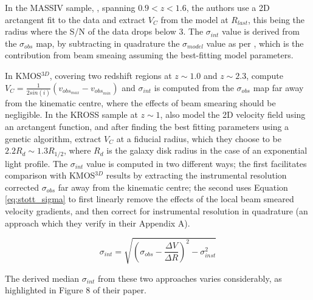 \documentclass[fleqn,usenatbib]{mn2e}
\begin{document}
In the MASSIV sample, \citep{Epinat2012}, spanning $0.9 < z < 1.6$, the authors use a 2D arctangent fit to the data and extract $V_{C}$ from the model at $R_{last}$, this being the radius where the S/N of the data drops below 3.
The $\sigma_{int}$ value is derived from the $\sigma_{obs}$ map, by subtracting in quadrature the $\sigma_{model}$ value as per \cite{Epinat2010}, which is the contribution from beam smeaing assuming the best-fitting model parameters. 

In KMOS$^{3D}$, covering two redshift regions at $z \sim 1.0$ and $z \sim 2.3$, \cite{Wisnioski2015} compute $V_{C} = \frac{1}{2sin(i)}(v_{obs_{max}} - v_{obs_{min}})$ and $\sigma_{int}$ is computed from the $\sigma_{obs}$ map far away from the kinematic centre, where the effects of beam smearing should be negligible.
In the KROSS sample at $z \sim 1$, \cite{Stott2016} also model the 2D velocity field using an arctangent function, and after finding the best fitting parameters using a genetic algorithm, extract $V_{C}$ at a fiducial radius, which they choose to be $2.2R_{d} \sim 1.3R_{1/2}$, where $R_{d}$ is the galaxy disk radius in the case of an exponential light profile.
The $\sigma_{int}$ value is computed in two different ways; the first facilitates comparison with KMOS$^{3D}$ results by extracting the instrumental resolution corrected $\sigma_{obs}$ far away from the kinematic centre; the second uses Equation \ref{eq:stott_sigma} to first linearly remove the effects of the local beam smeared velocity gradients, and then correct for instrumental resolution in quadrature (an approach which they verify in their Appendix A).

\begin{equation}\label{eq:stott_sigma}
   \sigma_{int} = \sqrt{\left(\sigma_{obs} - \frac{\Delta V}{\Delta R}\right)^{2} - \sigma_{inst}^{2}}
\end{equation}

The derived median $\sigma_{int}$ from these two approaches varies considerably, as highlighted in Figure 8 of their paper.
\end{document}
